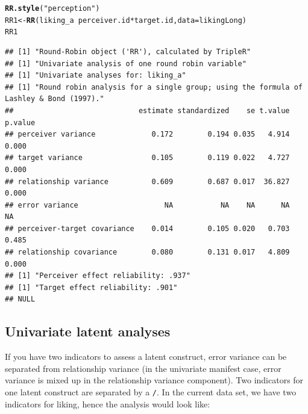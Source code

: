 \documentclass[a4paper]{article}\usepackage[]{graphicx}\usepackage[]{color}
\makeatletter
\newcommand{\hlstr}[1]{\textcolor[rgb]{0.192,0.494,0.8}{#1}}%
\newcommand{\hlopt}[1]{\textcolor[rgb]{0,0,0}{#1}}%
\newcommand{\hlstd}[1]{\textcolor[rgb]{0.345,0.345,0.345}{#1}}%
\newcommand{\hlkwb}[1]{\textcolor[rgb]{0.69,0.353,0.396}{#1}}%
\newcommand{\hlkwc}[1]{\textcolor[rgb]{0.333,0.667,0.333}{#1}}%
\newcommand{\hlkwd}[1]{\textcolor[rgb]{0.737,0.353,0.396}{\textbf{#1}}}%
\newenvironment{kframe}{%
 \def\at@end@of@kframe{}%
 \ifinner\ifhmode%
  \def\at@end@of@kframe{\end{minipage}}%
  \begin{minipage}{\columnwidth}%
 \fi\fi%
 \def\FrameCommand##1{\hskip\@totalleftmargin \hskip-\fboxsep
 \colorbox{shadecolor}{##1}\hskip-\fboxsep
     \hskip-\linewidth \hskip-\@totalleftmargin \hskip\columnwidth}%
 \MakeFramed {\advance\hsize-\width
   \@totalleftmargin\z@ \linewidth\hsize
   \@setminipage}}%
 {\par\unskip\endMakeFramed%
 \at@end@of@kframe}
\newenvironment{knitrout}{}{} %
\makeatother
\begin{document}
\begin{knitrout}\small
{}\color{fgcolor}\begin{kframe}
\begin{alltt}
\hlkwd{RR.style}\hlstd{(}\hlstr{"perception"}\hlstd{)}
\hlstd{RR1} \hlkwb{<-} \hlkwd{RR}\hlstd{(liking_a} \hlopt{~} \hlstd{perceiver.id} \hlopt{*} \hlstd{target.id,} \hlkwc{data} \hlstd{= likingLong)}
\hlstd{RR1}
\end{alltt}
\begin{verbatim}
## [1] "Round-Robin object ('RR'), calculated by TripleR"
## [1] "Univariate analysis of one round robin variable"
## [1] "Univariate analyses for: liking_a"
## [1] "Round robin analysis for a single group; using the formula of Lashley & Bond (1997)."
##                             estimate standardized    se t.value p.value
## perceiver variance             0.172        0.194 0.035   4.914   0.000
## target variance                0.105        0.119 0.022   4.727   0.000
## relationship variance          0.609        0.687 0.017  36.827   0.000
## error variance                    NA           NA    NA      NA      NA
## perceiver-target covariance    0.014        0.105 0.020   0.703   0.485
## relationship covariance        0.080        0.131 0.017   4.809   0.000
## [1] "Perceiver effect reliability: .937"
## [1] "Target effect reliability: .901"
## NULL
\end{verbatim}
\end{kframe}
\end{knitrout}




\subsection{Univariate latent analyses} %
\label{sub:univariate_latent_analyses}
If you have two indicators to assess a latent construct, error variance can be separated from relationship variance (in the univariate manifest case, error variance is mixed up in the relationship variance component). Two indicators for one latent construct are separated by a \texttt{/}. In the current data set, we have two indicators for liking, hence the analysis would look like:
\end{document}
